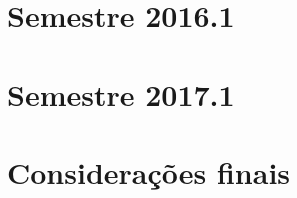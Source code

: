 \subsection{\ProblemaI}

\section{Semestre 2016.1}
\label{sec-exp-2016}

\section{Semestre 2017.1}
\label{sec-exp-2017}

\section{Considerações finais}
